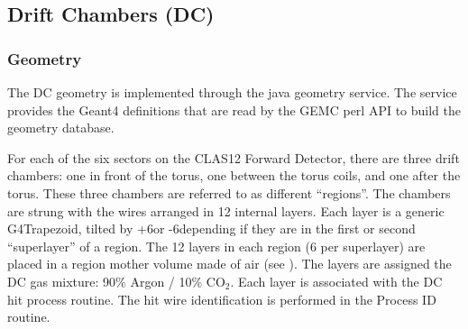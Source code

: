\subsection{Drift Chambers (DC)}

\subsubsection{Geometry}

The DC geometry is implemented through the java geometry service.
The service provides the Geant4 definitions that are read by the GEMC perl API to build the geometry database.

For each of the six sectors on the CLAS12 Forward Detector, there are three drift chambers: one in front of the torus,
one between the torus coils, and one after the torus.  These three chambers are referred to as different ``regions''.
The chambers are strung with the wires arranged in 12 internal layers.
Each layer is a generic G4Trapezoid, tilted by +6\mdeg or -6\mdeg depending if they are in the first or second
``superlayer'' of a region.
The 12 layers in each region (6 per superlayer) are placed in a region mother volume made of air (see ).
The layers are assigned the DC gas mixture: 90$\%$ Argon / 10$\%$ CO$_2$. Each layer is associated with the DC hit process routine.
The hit wire identification is performed in the Process ID routine.

